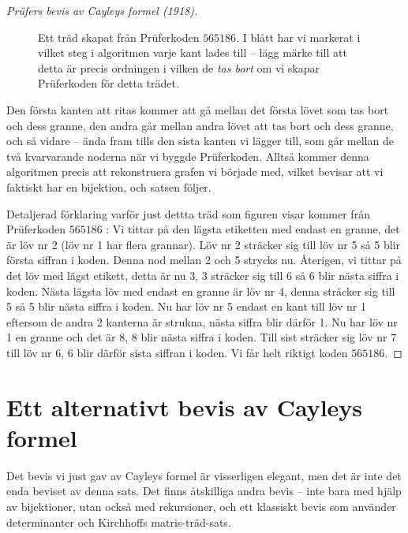 \documentclass[nobib]{tufte-handout}
\begin{document}
\begin{proof}[Prüfers bevis av Cayleys formel (1918)]
\begin{figure}
        
        \caption{Ett träd skapat från Prüferkoden $565186$. I blått har vi markerat i vilket steg i algoritmen varje kant lades till -- lägg märke till att detta är precis ordningen i vilken de \emph{tas bort} om vi skapar Prüferkoden för detta trädet.} 
    \end{figure}

    Den första kanten att ritas kommer att gå mellan det första lövet som tas bort och dess granne, den andra går mellan andra lövet att tas bort och dess granne, och så vidare -- ända fram tills den sista kanten vi lägger till, som går mellan de två kvarvarande noderna när vi byggde Prüferkoden. Alltså kommer denna algoritmen precis att rekonstruera grafen vi började med, vilket bevisar att vi faktiskt har en bijektion, och satsen följer.

    Detaljerad förklaring varför just dettta träd som figuren visar kommer från Prüferkoden $565186$ : Vi tittar på den lägsta etiketten med endast en granne, det är löv nr 2 (löv nr 1 har flera grannar). Löv nr 2 sträcker sig till löv nr 5 så 5 blir första siffran i koden. Denna nod mellan 2 och 5 strycks nu. Återigen, vi tittar på det löv med lägst etikett, detta är nu 3, 3 sträcker sig till 6 så 6 blir nästa siffra i koden. Nästa lägsta löv med endast en granne är löv nr 4, denna sträcker sig till 5 så 5 blir nästa siffra i koden. Nu har löv nr 5 endast en kant till löv nr 1 eftersom de andra 2 kanterna är strukna, nästa siffra blir därför 1. Nu har löv nr 1 en granne och det är 8, 8 blir nästa siffra i koden. Till sist sträcker sig löv nr 7 till löv nr 6, 6 blir därför sista siffran i koden. Vi får helt riktigt koden $565186$.

    
\end{proof}

\section{Ett alternativt bevis av Cayleys formel}

Det bevis vi just gav av Cayleys formel är visserligen elegant, men det är inte det enda beviset av denna sats. Det finns åtskilliga andra bevis -- inte bara med hjälp av bijektioner, utan också med rekursioner, och ett klassiskt bevis som använder determinanter och Kirchhoffs matris-träd-sats.
\end{document}

